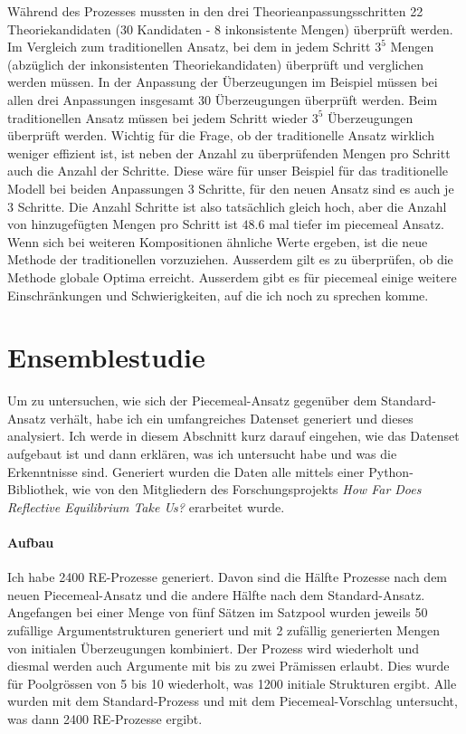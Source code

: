 \documentclass{article}
\begin{document}
 Während des Prozesses mussten in den drei Theorieanpassungsschritten 22 Theoriekandidaten (30 Kandidaten - 8 inkonsistente Mengen) überprüft werden.  Im Vergleich zum traditionellen Ansatz, bei dem in jedem Schritt $3^5$ Mengen (abzüglich der inkonsistenten Theoriekandidaten) überprüft und verglichen werden müssen. In der Anpassung der Überzeugungen im Beispiel müssen bei allen drei Anpassungen insgesamt 30 Überzeugungen überprüft werden. Beim traditionellen Ansatz müssen bei jedem Schritt wieder $3^5$ Überzeugungen überprüft werden. Wichtig für die Frage, ob der traditionelle Ansatz wirklich weniger effizient ist, ist neben der Anzahl zu überprüfenden Mengen pro Schritt auch die Anzahl der Schritte. Diese wäre für unser Beispiel für das traditionelle Modell bei beiden Anpassungen 3 Schritte, für den neuen Ansatz sind es auch je 3 Schritte. Die Anzahl Schritte ist also tatsächlich gleich hoch, aber die Anzahl von hinzugefügten Mengen pro Schritt ist $48.6$ mal tiefer im piecemeal Ansatz. Wenn sich bei weiteren Kompositionen ähnliche Werte ergeben, ist die neue Methode der traditionellen vorzuziehen. Ausserdem gilt es zu überprüfen, ob die Methode globale Optima erreicht. Ausserdem gibt es für piecemeal einige weitere Einschränkungen und Schwierigkeiten, auf die ich noch zu sprechen komme.

\section{Ensemblestudie} \label{Ensemblestudie}

Um zu untersuchen, wie sich der Piecemeal-Ansatz gegenüber dem Standard-Ansatz verhält, habe ich ein umfangreiches Datenset generiert und dieses analysiert. Ich werde in diesem Abschnitt kurz darauf eingehen, wie das Datenset aufgebaut ist und dann erklären, was ich untersucht habe und was die Erkenntnisse sind. Generiert wurden die Daten alle mittels einer Python-Bibliothek, wie von den Mitgliedern des Forschungsprojekts \textit{How Far Does Reflective Equilibrium Take Us?} erarbeitet wurde.

\paragraph{Aufbau} Ich habe 2400 RE-Prozesse generiert. Davon sind die Hälfte Prozesse nach dem neuen Piecemeal-Ansatz und die andere Hälfte nach dem Standard-Ansatz. Angefangen bei einer Menge von fünf Sätzen im Satzpool wurden jeweils 50 zufällige Argumentstrukturen generiert und mit 2 zufällig generierten Mengen von initialen Überzeugungen kombiniert. Der Prozess wird wiederholt und diesmal werden auch Argumente mit bis zu zwei Prämissen erlaubt. Dies wurde für Poolgrössen von 5 bis 10 wiederholt, was 1200 initiale Strukturen ergibt. Alle wurden mit dem Standard-Prozess und mit dem Piecemeal-Vorschlag untersucht, was dann 2400 RE-Prozesse ergibt.
\end{document}
